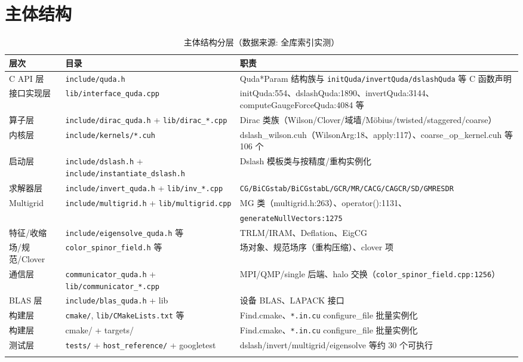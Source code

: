 \documentclass[UTF8]{ctexart}
\begin{document}
\section{主体结构}
\begin{xltabular}{\textwidth}{lXX}
\toprule
\textcolor{struct}{层次} & 目录 & \textcolor{struct}{职责} \\
\midrule
\endhead
C API 层 & \nolinkurl{include/quda.h} & Quda*Param 结构族与 \nolinkurl{initQuda/invertQuda/dslashQuda} 等 C 函数声明 \\
接口实现层 & \nolinkurl{lib/interface_quda.cpp} & initQuda:554、dslashQuda:1890、invertQuda:3144、computeGaugeForceQuda:4084 等 \\
算子层 & \nolinkurl{include/dirac_quda.h} + \nolinkurl{lib/dirac_*.cpp} & Dirac 类族（Wilson/Clover/域墙/Möbius/twisted/staggered/coarse）\\
内核层 & \nolinkurl{include/kernels/*.cuh} & dslash\_wilson.cuh（WilsonArg:18、apply:117）、coarse\_op\_kernel.cuh 等 106 个 \\
启动层 & \nolinkurl{include/dslash.h} + \nolinkurl{include/instantiate_dslash.h} & Dslash 模板类与按精度/重构实例化 \\
求解器层 & \nolinkurl{include/invert_quda.h} + \nolinkurl{lib/inv_*.cpp} & \nolinkurl{CG/BiCGstab/BiCGstabL/GCR/MR/CACG/CAGCR/SD/GMRESDR} \\
Multigrid & \nolinkurl{include/multigrid.h} + \nolinkurl{lib/multigrid.cpp} & MG 类（multigrid.h:263）、operator():1131、\\
& & \nolinkurl{generateNullVectors:1275} \\
特征/收缩 & \nolinkurl{include/eigensolve_quda.h} 等 & TRLM/IRAM、Deflation、EigCG \\
场/规范/Clover & \nolinkurl{color_spinor_field.h} 等 & 场对象、规范场序（重构压缩）、clover 项 \\
通信层 & \nolinkurl{communicator_quda.h} + \nolinkurl{lib/communicator_*.cpp} & MPI/QMP/single 后端、halo 交换（\nolinkurl{color_spinor_field.cpp:1256}）\\
BLAS 层 & \nolinkurl{include/blas_quda.h} + lib & 设备 BLAS、LAPACK 接口 \\
构建层 & \texttt{cmake/}, \nolinkurl{lib/CMakeLists.txt} 等 & Find\*.cmake、\texttt{*.in.cu} configure\_file 批量实例化 \\
构建层 & cmake/ + targets/ & Find\*.cmake、\texttt{*.in.cu} configure\_file 批量实例化 \\
测试层 & \texttt{tests/} + \nolinkurl{host_reference/} + googletest & dslash/invert/multigrid/eigensolve 等约 30 个可执行 \\
\bottomrule
\caption{主体结构分层（数据来源: 全库索引实测）}
\end{xltabular}
\end{document}
